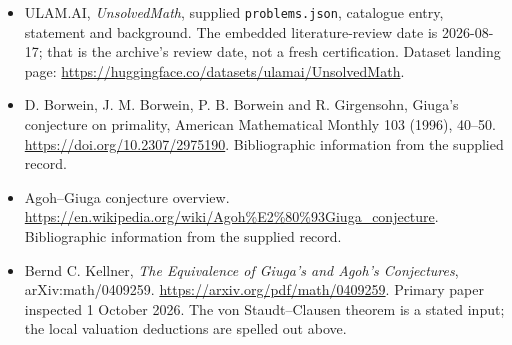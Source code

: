 \documentclass[11pt,a4paper]{article}
\begin{document}
{\small

\begin{itemize}

\item[\hypertarget{source:statement:1}{S1}] ULAM.AI, \emph{UnsolvedMath}, supplied \texttt{problems.json}, catalogue entry, statement and background. The embedded literature-review date is 2026-08-17; that is the archive’s review date, not a fresh certification. Dataset landing page: \url{https://huggingface.co/datasets/ulamai/UnsolvedMath}.

\item[\hypertarget{source:statement:2}{S2}] D. Borwein, J. M. Borwein, P. B. Borwein and R. Girgensohn, Giuga's conjecture on primality, American Mathematical Monthly 103 (1996), 40--50. \url{https://doi.org/10.2307/2975190}. Bibliographic information from the supplied record.

\item[\hypertarget{source:statement:3}{S3}] Agoh--Giuga conjecture overview. \url{https://en.wikipedia.org/wiki/Agoh%E2%80%93Giuga_conjecture}. Bibliographic information from the supplied record.


\item[E1] Bernd C. Kellner, \emph{The Equivalence of Giuga's and
Agoh's Conjectures}, arXiv:math/0409259.
\url{https://arxiv.org/pdf/math/0409259}.
Primary paper inspected 1 October 2026. The von Staudt--Clausen theorem
is a stated input; the local valuation deductions are spelled out above.

\end{itemize}

}

\label{end:statement}
\end{document}
